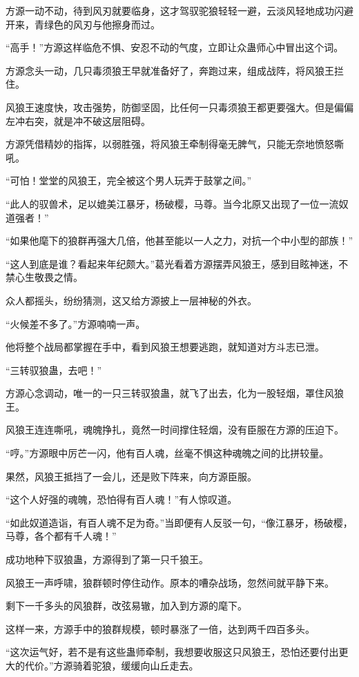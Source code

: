 \begin{this_body}
方源一动不动，待到风刃就要临身，这才驾驭驼狼轻轻一避，云淡风轻地成功闪避开来，青绿色的风刃与他擦身而过。

“高手！”方源这样临危不惧、安忍不动的气度，立即让众蛊师心中冒出这个词。

方源念头一动，几只毒须狼王早就准备好了，奔跑过来，组成战阵，将风狼王拦住。

风狼王速度快，攻击强势，防御坚固，比任何一只毒须狼王都更要强大。但是偏偏左冲右突，就是冲不破这层阻碍。

方源凭借精妙的指挥，以弱胜强，将风狼王牵制得毫无脾气，只能无奈地愤怒嘶吼。

“可怕！堂堂的风狼王，完全被这个男人玩弄于鼓掌之间。”

“此人的驭兽术，足以媲美江暴牙，杨破樱，马尊。当今北原又出现了一位一流奴道强者！”

“如果他麾下的狼群再强大几倍，他甚至能以一人之力，对抗一个中小型的部族！”

“这人到底是谁？看起来年纪颇大。”葛光看着方源摆弄风狼王，感到目眩神迷，不禁心生敬畏之情。

众人都摇头，纷纷猜测，这又给方源披上一层神秘的外衣。

“火候差不多了。”方源喃喃一声。

他将整个战局都掌握在手中，看到风狼王想要逃跑，就知道对方斗志已泄。

“三转驭狼蛊，去吧！”

方源心念调动，唯一的一只三转驭狼蛊，就飞了出去，化为一股轻烟，罩住风狼王。

风狼王连连嘶吼，魂魄挣扎，竟然一时间撑住轻烟，没有臣服在方源的压迫下。

“哼。”方源眼中厉芒一闪，他有百人魂，丝毫不惧这种魂魄之间的比拼较量。

果然，风狼王抵挡了一会儿，还是败下阵来，向方源臣服。

“这个人好强的魂魄，恐怕得有百人魂！”有人惊叹道。

“如此奴道造诣，有百人魂不足为奇。”当即便有人反驳一句，“像江暴牙，杨破樱，马尊，各个都有千人魂！”

成功地种下驭狼蛊，方源得到了第一只千狼王。

风狼王一声呼啸，狼群顿时停住动作。原本的嘈杂战场，忽然间就平静下来。

剩下一千多头的风狼群，改弦易辙，加入到方源的麾下。

这样一来，方源手中的狼群规模，顿时暴涨了一倍，达到两千四百多头。

“这次运气好，若不是有这些蛊师牵制，我想要收服这只风狼王，恐怕还要付出更大的代价。”方源骑着驼狼，缓缓向山丘走去。


\end{this_body}

